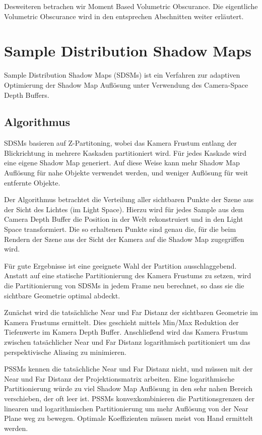 \documentclass[runningheaders,a4paper]{llncs}
\begin{document}
Desweiteren betrachen wir Moment Based Volumetric Obscurance. Die eigentliche Volumetric Obscurance wird in den entsprechen Abschnitten weiter erläutert.

\section{Sample Distribution Shadow Maps}

Sample Distribution Shadow Maps (SDSMs) ist ein Verfahren zur adaptiven Optimierung der Shadow Map Auflösung unter Verwendung des Camera-Space Depth Buffers.

\subsection{Algorithmus}

SDSMs basieren auf Z-Partitoning, wobei das Kamera Frustum entlang der Blickrichtung in mehrere Kaskaden partitioniert wird. Für jedes Kaskade wird eine eigene Shadow Map generiert.
Auf diese Weise kann mehr Shadow Map Auflösung für nahe Objekte verwendet werden, und weniger Auflösung für weit entfernte Objekte.


Der Algorithmus betrachtet die Verteilung aller sichtbaren Punkte der Szene aus der Sicht des Lichtes (im Light Space).
Hierzu wird für jedes Sample aus dem Camera Depth Buffer die Position in der Welt rekonstruiert und in den Light Space transformiert.
Die so erhaltenen Punkte sind genau die, für die beim Rendern der Szene aus der Sicht der Kamera auf die Shadow Map zugegriffen wird.


Für gute Ergebnisse ist eine geeignete Wahl der Partition ausschlaggebend.
Anstatt auf eine statische Partitionierung des Kamera Frustums \cite{pssm} zu setzen, wird die Partitionierung von SDSMs in jedem Frame neu berechnet, so dass sie die sichtbare Geometrie optimal abdeckt.

Zunächst wird die tatsächliche Near und Far Distanz der sichtbaren Geometrie im Kamera Frustums ermittelt.
Dies geschieht mittels Min/Max Reduktion der Tiefenwerte im Kamera Depth Buffer.
Anschließend wird das Kamera Frustum zwischen tatsächlicher Near und Far Distanz logarithmisch partitioniert um das perspektivische Aliasing zu minimieren.

PSSMs kennen die tatsächliche Near und Far Distanz nicht, und müssen mit der Near und Far Distanz der Projektionsmatrix arbeiten.
Eine logarithmische Partitionierung würde zu viel Shadow Map Auflösung in den sehr nahen Bereich verschieben, der oft leer ist.
PSSMs konvexkombinieren die Partitionsgrenzen der linearen und logarithmischen Partitionierung um mehr Auflösung von der Near Plane weg zu bewegen.
Optimale Koeffizienten müssen meist von Hand ermittelt werden.
\end{document}
